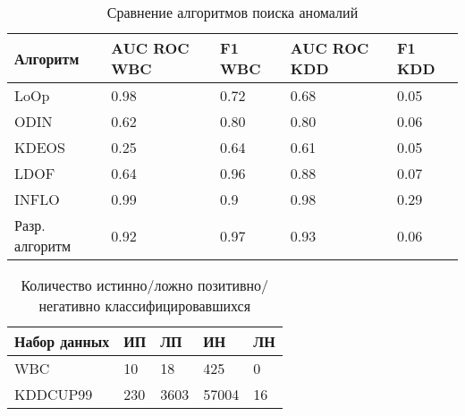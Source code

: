 \begin{table*}[h]
	
	\caption{\label{tab:issled2}Сравнение  алгоритмов поиска аномалий}
	
	\begin{center}
		
		\begin{tabular}{|l|l|l|l|l|}
			
			\hline
			
			Алгоритм & AUC ROC WBC & F1 WBC &  AUC ROC KDD & F1 KDD \\
			
			\hline 
			
			LoOp& 0.98 & 0.72 & 0.68& 0.05  \\
			
			\hline
			ODIN & 0.62 & 0.80 & 0.80& 0.06  \\
			
			\hline 
			KDEOS & 0.25	 & 0.64 & 0.61& 0.05  \\
			
			\hline 
			LDOF & 0.64	 & 0.96 & 0.88&0.07  \\
			\hline 
			INFLO & 0.99	 & 0.9 & 0.98&0.29  \\
			\hline   
			Разр. алгоритм & 0.92	 & 0.97 & 0.93 & 0.06  \\
			
			\hline  
			
		\end{tabular}
		
	\end{center}
	
\end{table*}
\begin{table*}[h]
	
	\caption{\label{tab:issled2}Количество истинно/ложно позитивно/негативно классифицировавшихся}
	
	\begin{center}
		
		\begin{tabular}{|l|l|l|l|l|}
			
			\hline
			
			Набор данных & ИП & ЛП &  ИН & ЛН \\
			
			\hline 
			
			WBC & 10 & 18 & 425 & 0  \\
			\hline 
			
			KDDCUP99& 230 & 3603 & 57004& 16  \\	 
			
			\hline  
			
		\end{tabular}
		
	\end{center}
	
\end{table*}
